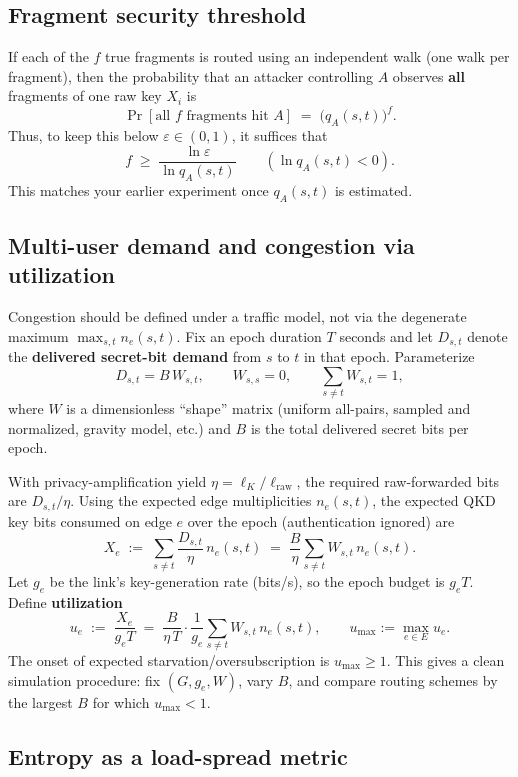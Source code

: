 \documentclass[journal]{IEEEtran}
\begin{document}
\subsection*{Fragment security threshold}

If each of the $f$ true fragments is routed using an independent walk (one walk per fragment),
then the probability that an attacker controlling $A$ observes \textbf{all} fragments of one raw key $X_i$ is
$$
\Pr[\text{all }f\text{ fragments hit }A]
\;=\;
\big(q_A(s,t)\big)^f.
$$
Thus, to keep this below $\varepsilon\in(0,1)$, it suffices that
$$
f
\;\ge\;
\frac{\ln \varepsilon}{\ln q_A(s,t)}
\qquad(\ln q_A(s,t)<0).
$$
This matches your earlier experiment once $q_A(s,t)$ is estimated.

\subsection*{Multi-user demand and congestion via utilization}

Congestion should be defined under a traffic model, not via the degenerate maximum
$\max_{s,t}n_e(s,t)$.
Fix an epoch duration $T$ seconds and let $D_{s,t}$ denote the
\textbf{delivered secret-bit demand} from $s$ to $t$ in that epoch.
Parameterize
$$
D_{s,t} = B\,W_{s,t},
\qquad
W_{s,s}=0,
\qquad
\sum_{s\neq t} W_{s,t}=1,
$$
where $W$ is a dimensionless ``shape'' matrix
(uniform all-pairs, sampled and normalized, gravity model, etc.)
and $B$ is the total delivered secret bits per epoch.

With privacy-amplification yield $\eta=\ell_K/\ell_{\mathrm{raw}}$,
the required raw-forwarded bits are $D_{s,t}/\eta$.
Using the expected edge multiplicities $n_e(s,t)$, the expected QKD key bits
consumed on edge $e$ over the epoch (authentication ignored) are
$$
X_e
\;:=\;
\sum_{s\neq t} \frac{D_{s,t}}{\eta}\,n_e(s,t)
\;=\;
\frac{B}{\eta}\sum_{s\neq t} W_{s,t}\,n_e(s,t).
$$
Let $g_e$ be the link's key-generation rate (bits/s), so the epoch budget is $g_eT$.
Define \textbf{utilization}
$$
u_e
\;:=\;
\frac{X_e}{g_eT}
\;=\;
\frac{B}{\eta\,T}\cdot
\frac{1}{g_e}\sum_{s\neq t} W_{s,t}\,n_e(s,t),
\qquad
u_{\max}:=\max_{e\in E}u_e.
$$
The onset of expected starvation/oversubscription is $u_{\max}\ge 1$.
This gives a clean simulation procedure: fix $(G,g_e,W)$, vary $B$, and compare
routing schemes by the largest $B$ for which $u_{\max}<1$.

\subsection*{Entropy as a load-spread metric}
\end{document}
